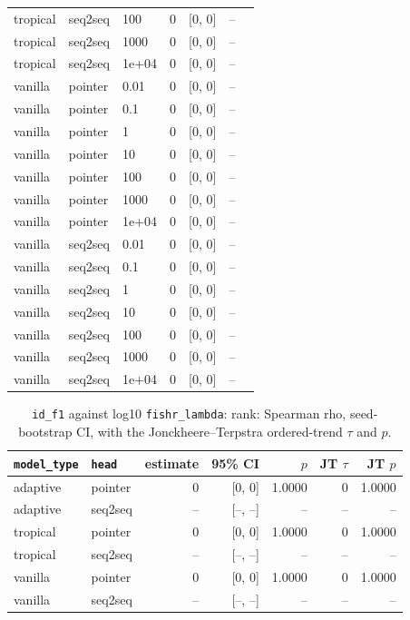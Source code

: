 \documentclass[10pt]{article}
\begin{document}
{\begin{longtable}{lllrrrl}
tropical & seq2seq & 100 & 0 & [0, 0] & -- & \\
tropical & seq2seq & 1000 & 0 & [0, 0] & -- & \\
tropical & seq2seq & 1e+04 & 0 & [0, 0] & -- & \\
vanilla & pointer & 0.01 & 0 & [0, 0] & -- & \\
vanilla & pointer & 0.1 & 0 & [0, 0] & -- & \\
vanilla & pointer & 1 & 0 & [0, 0] & -- & \\
vanilla & pointer & 10 & 0 & [0, 0] & -- & \\
vanilla & pointer & 100 & 0 & [0, 0] & -- & \\
vanilla & pointer & 1000 & 0 & [0, 0] & -- & \\
vanilla & pointer & 1e+04 & 0 & [0, 0] & -- & \\
vanilla & seq2seq & 0.01 & 0 & [0, 0] & -- & \\
vanilla & seq2seq & 0.1 & 0 & [0, 0] & -- & \\
vanilla & seq2seq & 1 & 0 & [0, 0] & -- & \\
vanilla & seq2seq & 10 & 0 & [0, 0] & -- & \\
vanilla & seq2seq & 100 & 0 & [0, 0] & -- & \\
vanilla & seq2seq & 1000 & 0 & [0, 0] & -- & \\
vanilla & seq2seq & 1e+04 & 0 & [0, 0] & -- & \\
\bottomrule
\end{longtable}
}

{\small
\begin{longtable}{llrrrrr}
\caption{\texttt{id\_f1} against log10 \texttt{fishr\_lambda}: rank: Spearman rho, seed-bootstrap CI, with the Jonckheere--Terpstra ordered-trend $\tau$ and $p$.}\label{tab:trend-id_f1}\\
\toprule
\texttt{model\_type} & \texttt{head} & estimate & 95\% CI & $p$ & JT $\tau$ & JT $p$\\
\midrule
\endhead
adaptive & pointer & 0 & [0, 0] & 1.0000 & 0 & 1.0000\\
adaptive & seq2seq & -- & [--, --] & -- & -- & --\\
tropical & pointer & 0 & [0, 0] & 1.0000 & 0 & 1.0000\\
tropical & seq2seq & -- & [--, --] & -- & -- & --\\
vanilla & pointer & 0 & [0, 0] & 1.0000 & 0 & 1.0000\\
vanilla & seq2seq & -- & [--, --] & -- & -- & --\\
\bottomrule
\end{longtable}
}
\end{document}
